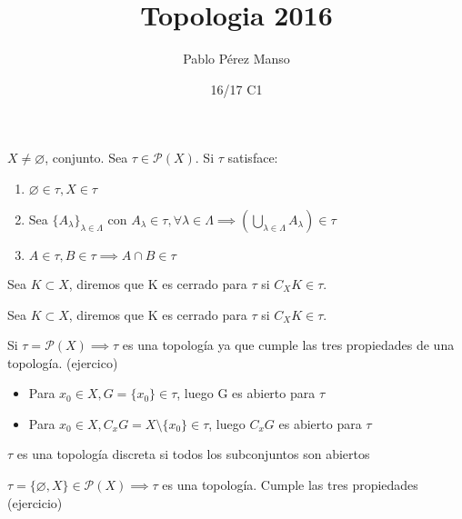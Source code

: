 \documentclass[palatino]{apuntes}
\title{Topologia 2016}
\author{Pablo Pérez Manso}
\date{16/17 C1}
\begin{document}
\pagestyle{plain}
\maketitle

\tableofcontents
\newpage

\begin{defn}[Topología]
$X \neq \varnothing$, conjunto. Sea $\tau \in \mathcal{P}(X)$. Si $\tau$ satisface:
\begin{enumerate}
\item $\varnothing \in \tau, X \in \tau$
\item Sea $\{A_\lambda\}_{\lambda \in \Lambda}$ con $ A_\lambda \in \tau, \forall \lambda \in \Lambda \implies  (\bigcup_{\lambda \in \Lambda} A_\lambda) \in \tau$
\item $A \in \tau, B \in \tau \implies A \cap B \in \tau$
\end{enumerate}
\end{defn}



\begin{defn}[Abierto]
Sea $K \subset X$, diremos que K es cerrado para $\tau$ si $C_XK\in\tau$.
\end{defn}
\begin{defn}[Cerrado]
Sea $K \subset X$, diremos que K es cerrado para $\tau$ si $C_XK\in\tau$.
\end{defn}

\begin{example}
	Si $\tau = \mathcal{P}(X) \implies \tau $ es una topología ya que cumple las tres propiedades de una topología. (ejercico)

	\begin{itemize}
		\item Para $x_0 \in X, G=\{x_0\} \in \tau$, luego G es abierto para $\tau$
		\item Para $x_0 \in X, C_xG=X\setminus\{x_0\} \in \tau$, luego $C_xG$ es abierto para $\tau$
	\end{itemize}
\end{example}

\begin{defn}
$\tau$ es una topología discreta si todos los subconjuntos son abiertos
\end{defn}


\begin{example}
$\tau = \{\varnothing, X\} \in \mathcal{P}(X) \implies \tau$ es una topología. Cumple las tres propiedades (ejercicio)
\end{example}
\end{document}
